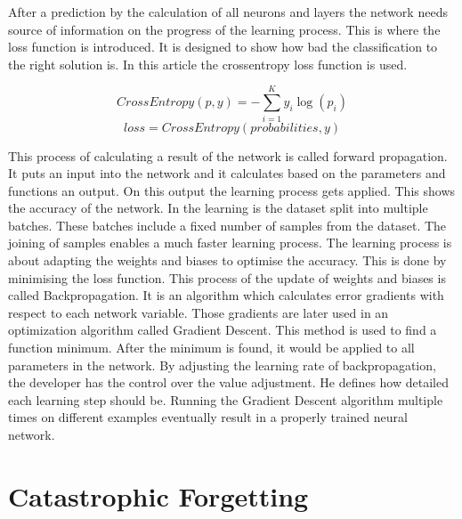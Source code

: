 After a prediction by the calculation of all neurons and layers the network needs source of information on the progress of the learning process.
This is where the loss function is introduced.
It is designed to show how bad the classification to the right solution is.
In this article the crossentropy loss function is used.
\cite{math_nn_skalski, medium_nn_from_scratch}

\begin{equation}
    CrossEntropy(p,y) = -\sum_{i=1}^K y_i \log(p_i)
\end{equation}
\begin{equation}
    loss = CrossEntropy(probabilities, y)
\end{equation}

This process of calculating a result of the network is called forward propagation.
It puts an input into the network and it calculates based on the parameters and functions an output.
On this output the learning process gets applied.
This shows the accuracy of the network.
\cite{math_nn_skalski, medium_nn_from_scratch}
\newline
In the learning is the dataset split into multiple batches. These batches include a fixed number of samples from the dataset. The joining of samples enables a much faster learning process.
The learning process is about adapting the weights and biases to optimise the accuracy.
This is done by minimising the loss function.
This process of the update of weights and biases is called Backpropagation.
It is an algorithm which calculates error gradients with respect to each network variable.
Those gradients are later used in an optimization algorithm called Gradient Descent.
This method is used to find a function minimum.
After the minimum is found, it would be applied to all parameters in the network.
By adjusting the learning rate of backpropagation, the developer has the control over the value adjustment.
He defines how detailed each learning step should be.
\cite{math_nn_andrey}
\newline
Running the Gradient Descent algorithm multiple times on different examples eventually result in a properly trained neural network.

\section{Catastrophic Forgetting}

